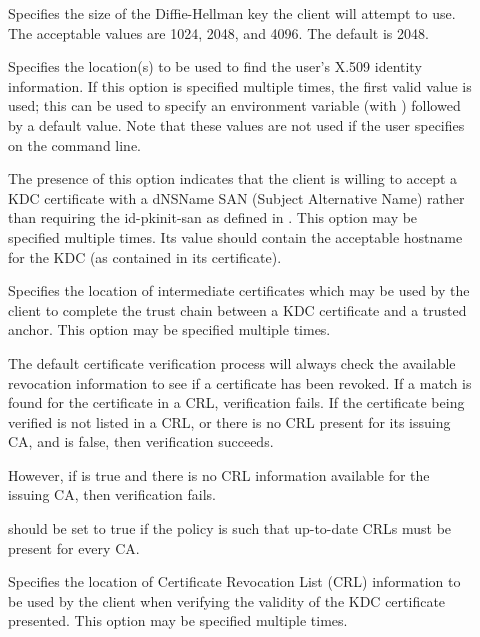 \documentclass[letterpaper,10pt,english]{sphinxmanual}
\begin{document}
\begin{description}
\item[{}] \leavevmode
Specifies the size of the Diffie-Hellman key the client will
attempt to use.  The acceptable values are 1024, 2048, and 4096.
The default is 2048.

\item[{}] \leavevmode
Specifies the location(s) to be used to find the user’s X.509
identity information.  If this option is specified multiple times,
the first valid value is used; this can be used to specify an
environment variable (with ) followed by a
default value.  Note that these values are not used if the user
specifies  on the command line.

\item[{}] \leavevmode
The presence of this option indicates that the client is willing
to accept a KDC certificate with a dNSName SAN (Subject
Alternative Name) rather than requiring the id-pkinit-san as
defined in .  This option may be specified multiple
times.  Its value should contain the acceptable hostname for the
KDC (as contained in its certificate).

\item[{}] \leavevmode
Specifies the location of intermediate certificates which may be
used by the client to complete the trust chain between a KDC
certificate and a trusted anchor.  This option may be specified
multiple times.

\item[{}] \leavevmode
The default certificate verification process will always check the
available revocation information to see if a certificate has been
revoked.  If a match is found for the certificate in a CRL,
verification fails.  If the certificate being verified is not
listed in a CRL, or there is no CRL present for its issuing CA,
and  is false, then verification
succeeds.

However, if  is true and there is
no CRL information available for the issuing CA, then verification
fails.

 should be set to true if the
policy is such that up-to-date CRLs must be present for every CA.

\item[{}] \leavevmode
Specifies the location of Certificate Revocation List (CRL)
information to be used by the client when verifying the validity
of the KDC certificate presented.  This option may be specified
multiple times.

\end{description}
\end{document}
